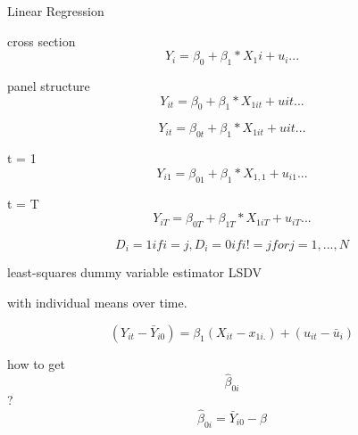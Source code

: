 \documentclass{article}
\begin{document}
Linear Regression 

cross section \[ Y_i = \beta_0 + \beta_1*X_1i + u_i ... \]

panel structure \[ Y_{it} = \beta_0 + \beta_1*X_{1it} + u{it} ... \]

                \[ Y_{it} = \beta_{0t} +  \beta_1*X_{1it} + u{it} ... \]
                
                t = 1 \[ Y_{i1} = \beta_{01} + \beta_1*X_{1,1} + u_{i1} ... \]
                
                t = T \[ Y_{iT} = \beta_{0T} + \beta_{1T}*X_{1iT} + u_{iT} ... \]
                
                
                
                \[ D_{i} = 1 if i = j,  D_{i} = 0 if i != j for j = 1,..., N \]
                
                least-squares dummy variable estimator LSDV 
                
                
                
                
                with individual means over time.
                
                
               \[ (Y_{it} - \bar Y_{i0}) = \beta_1(X_{it}-x_{1i.}) + (u_{it} - \bar u_i) \]
               
               how to get \[ \hat \beta_{0i} \] ?
               \[ \hat \beta_{0i} = \bar Y_{i0} - \beta \]
                
                
                
\end{document}
